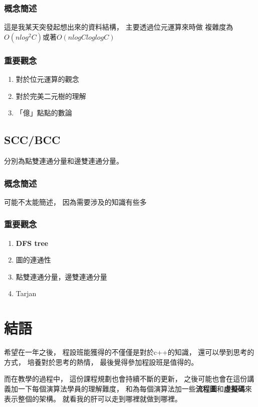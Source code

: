 \documentclass[12pt,oneside]{article}
\begin{document}
\subsubsection*{概念簡述}
這是我某天突發起想出來的資料結構，
主要透過位元運算來時做
複雜度為$O(nlog^2C)$或著$O(nlogC loglogC )$ 
\subsubsection*{重要觀念}
\begin{adjustwidth}{2em}{0em}
\begin{enumerate}
    \item 
        對於位元運算的觀念
    \item 
        對於完美二元樹的理解
    \item 
        「億」點點的數論
\end{enumerate}
\end{adjustwidth}
\clearpage


\subsection{SCC/BCC}
分別為點雙連通分量和邊雙連通分量。

\subsubsection*{概念簡述}
可能不太能簡述，
因為需要涉及的知識有些多
\subsubsection*{重要觀念}
\begin{adjustwidth}{2em}{0em}
\begin{enumerate}
    \item \textbf{DFS tree}
    \item 圖的連通性
    \item 點雙連通分量，邊雙連通分量
    \item Tarjan
\end{enumerate}
\end{adjustwidth}


\section{結語}
希望在一年之後，
程設班能獲得的不僅僅是對於c++的知識，
還可以學到思考的方式，
培養對於思考的熱情，
最後覺得參加程設班是值得的。

而在教學的過程中，
這份課程規劃也會持續不斷的更新，
之後可能也會在這份講義加一下每個演算法學員的理解難度，
和為每個演算法加一些\textbf{流程圖}和\textbf{虛擬碼}來表示整個的架構。
就看我的肝可以走到哪裡就做到哪裡。
\end{document}
